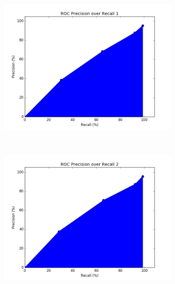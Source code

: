 \documentclass[12pt]{article}
\begin{document}
\begin{figure}[h!]
    \centering
    \begin{subfigure}[t]{0.5\textwidth}
        \centering
        \includegraphics[width=1.\textwidth]{graphs/problem3_ROC1}
        \caption{}
    \end{subfigure}%
    ~ 
    \begin{subfigure}[t]{0.5\textwidth}
        \centering
        \includegraphics[width=1.\textwidth]{graphs/problem3_ROC2}
        \caption{}
    \end{subfigure}%
\end{figure}
\end{document}
